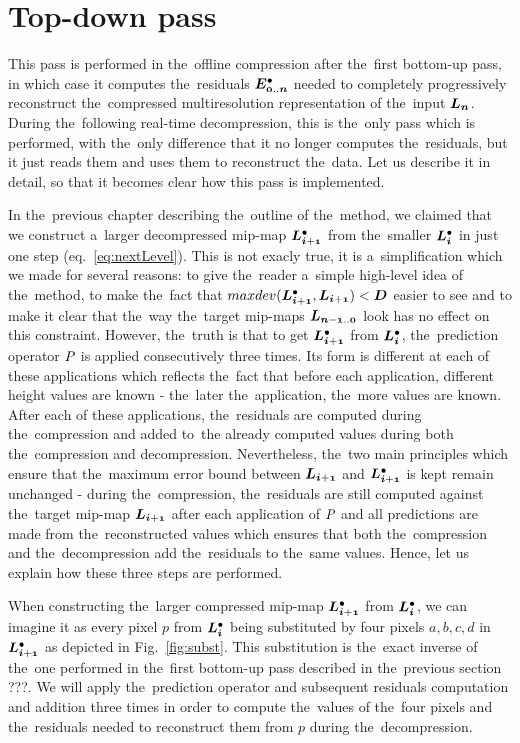 \section{Top-down pass}\label{sec:top-down}
This pass is performed in the~offline compression after the~first bottom-up pass, in which case it computes the~residuals $\objdot{E}{0..n}$ needed to completely progressively reconstruct the~compressed multiresolution representation of the~input $\lnorm{n}$. During the~following real-time decompression, this is the~only pass which is performed, with the~only difference that it no longer computes the~residuals, but it just reads them and uses them to reconstruct the~data. Let us describe it in detail, so that it becomes clear how this pass is implemented.

In the~previous chapter describing the~outline of the~method, we claimed that we construct a~larger decompressed mip-map $\ldot{i+1}$ from the~smaller $\ldot{i}$ in just one step (eq.~\ref{eq:nextLevel}). This is not exacly true, it is a~simplification which we made for several reasons: to give the~reader a~simple high-level idea of the~method, to make the~fact that $maxdev(\ldot{i+1}, \lnorm{i+1}) < \objnorm{D}{}$ easier to see and to make it clear that the~way the~target mip-maps $\lnorm{n-1..0}$ look has no effect on this constraint. However, the~truth is that to get $\ldot{i+1}$ from $\ldot{i}$, the~prediction operator $\mathit{P_{}}$ is applied consecutively three times. Its form is different at each of these applications which reflects the~fact that before each application, different height values are known - the~later the~application, the~more values are known. After each of these applications, the~residuals are computed during the~compression and added to~the already computed values during both the~compression and decompression. Nevertheless, the~two main principles which ensure that the~maximum error bound between $\lnorm{i+1}$ and $\ldot{i+1}$ is kept remain unchanged - during the~compression, the~residuals are still computed against the~target mip-map $\lnorm{i+1}$ after each application of $\mathit{P_{}}$ and all predictions are made from the~reconstructed values which ensures that both the~compression and the~decompression add the~residuals to the~same values. Hence, let us explain how these three steps are performed.

 When constructing the~larger compressed mip-map $\ldot{i+1}$ from $\ldot{i}$, we can imagine it as every pixel $p$ from $\ldot{i}$ being substituted by four pixels $a, b, c, d$ in $\ldot{i+1}$ as depicted in Fig.~\ref{fig:subst}. This substitution is the~exact inverse of the~one performed in the~first bottom-up pass described in the~previous section ???. We will apply the~prediction operator and subsequent residuals computation and addition three times in order to compute the~values of the~four pixels and the~residuals needed to reconstruct them from $p$ during the~decompression.

